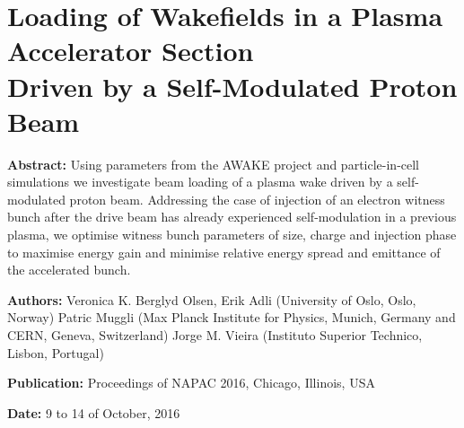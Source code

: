 %
%

\chapter{Loading of Wakefields in a Plasma Accelerator Section\\
         Driven by a Self-Modulated Proton Beam}
\label{Pub:NAPAC16}

\begin{hangparas}{10mm}{1}

    \textbf{Abstract:}
    Using parameters from the AWAKE project and particle-in-cell simulations we investigate beam loading of a plasma
    wake driven by a self-modulated proton beam. Addressing the case of injection of an electron witness bunch after
    the drive beam has already experienced self-modulation in a previous plasma, we optimise witness bunch parameters of
    size, charge and injection phase to maximise energy gain and minimise relative energy spread and emittance of the
    accelerated bunch.

    \vspace{5mm}

    \textbf{Authors:}
    Veronica K. Berglyd Olsen, Erik Adli (University of Oslo, Oslo, Norway)
    Patric Muggli (Max Planck Institute for Physics, Munich, Germany and CERN, Geneva, Switzerland)
    Jorge M. Vieira (Instituto Superior Technico, Lisbon, Portugal)

    \vspace{5mm}

    \textbf{Publication:}
    Proceedings of NAPAC 2016, Chicago, Illinois, USA

    \vspace{5mm}

    \textbf{Date:} 9 to 14 of October, 2016


\end{hangparas}
